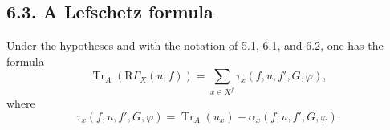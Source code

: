 \documentclass[11pt]{article}
\providecommand{\Tr}{\operatorname{Tr}}
\providecommand{\Tr}{\operatorname{Tr}}
\providecommand{\Tr}{\operatorname{Tr}}
\providecommand{\Tr}{\operatorname{Tr}}
\providecommand{\RG}{\mathrm R\Gamma}
\providecommand{\Tr}{\operatorname{Tr}}
\begin{document}
\subsection*{6.3. A Lefschetz formula}\label{sga5:XII:subsection:6.3}
Under the hypotheses and with the notation of \hyperref[sga5:XII:proposition:5.1]{5.1}, \hyperref[sga5:XII:subsection:6.1]{6.1}, and \hyperref[sga5:XII:subsection:6.2]{6.2}, one has the formula
\begin{equation}
\tag{6.3.1}\label{sga5:XII:equation:6.3.1}
\Tr_A(\RG_X(u,f))=\sum_{x\in X^f}\tau_x(f,u,f',G,\varphi),
\end{equation}
where
\begin{equation}
\tag{6.3.2}\label{sga5:XII:equation:6.3.2}
\tau_x(f,u,f',G,\varphi)=\Tr_A(u_x)-\alpha_x(f,u,f',G,\varphi).
\end{equation}
\end{document}
